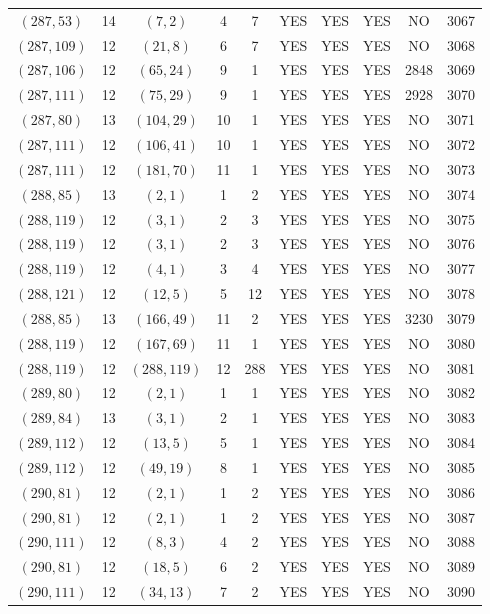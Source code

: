 \begin{longtable}{|c|c|c|c|c|c|c|c|c|c|}
$(287, 53)$ & 14 & $(7, 2)$ & 4 & 7 & YES & YES & YES & NO & 3067\\
$(287, 109)$ & 12 & $(21, 8)$ & 6 & 7 & YES & YES & YES & NO & 3068\\
$(287, 106)$ & 12 & $(65, 24)$ & 9 & 1 & YES & YES & YES & 2848 & 3069\\
$(287, 111)$ & 12 & $(75, 29)$ & 9 & 1 & YES & YES & YES & 2928 & 3070\\
$(287, 80)$ & 13 & $(104, 29)$ & 10 & 1 & YES & YES & YES & NO & 3071\\
$(287, 111)$ & 12 & $(106, 41)$ & 10 & 1 & YES & YES & YES & NO & 3072\\
$(287, 111)$ & 12 & $(181, 70)$ & 11 & 1 & YES & YES & YES & NO & 3073\\
$(288, 85)$ & 13 & $(2, 1)$ & 1 & 2 & YES & YES & YES & NO & 3074\\
$(288, 119)$ & 12 & $(3, 1)$ & 2 & 3 & YES & YES & YES & NO & 3075\\
$(288, 119)$ & 12 & $(3, 1)$ & 2 & 3 & YES & YES & YES & NO & 3076\\
$(288, 119)$ & 12 & $(4, 1)$ & 3 & 4 & YES & YES & YES & NO & 3077\\
$(288, 121)$ & 12 & $(12, 5)$ & 5 & 12 & YES & YES & YES & NO & 3078\\
$(288, 85)$ & 13 & $(166, 49)$ & 11 & 2 & YES & YES & YES & 3230 & 3079\\
$(288, 119)$ & 12 & $(167, 69)$ & 11 & 1 & YES & YES & YES & NO & 3080\\
$(288, 119)$ & 12 & $(288, 119)$ & 12 & 288 & YES & YES & YES & NO & 3081\\
$(289, 80)$ & 12 & $(2, 1)$ & 1 & 1 & YES & YES & YES & NO & 3082\\
$(289, 84)$ & 13 & $(3, 1)$ & 2 & 1 & YES & YES & YES & NO & 3083\\
$(289, 112)$ & 12 & $(13, 5)$ & 5 & 1 & YES & YES & YES & NO & 3084\\
$(289, 112)$ & 12 & $(49, 19)$ & 8 & 1 & YES & YES & YES & NO & 3085\\
$(290, 81)$ & 12 & $(2, 1)$ & 1 & 2 & YES & YES & YES & NO & 3086\\
$(290, 81)$ & 12 & $(2, 1)$ & 1 & 2 & YES & YES & YES & NO & 3087\\
$(290, 111)$ & 12 & $(8, 3)$ & 4 & 2 & YES & YES & YES & NO & 3088\\
$(290, 81)$ & 12 & $(18, 5)$ & 6 & 2 & YES & YES & YES & NO & 3089\\
$(290, 111)$ & 12 & $(34, 13)$ & 7 & 2 & YES & YES & YES & NO & 3090\\

\end{longtable}
